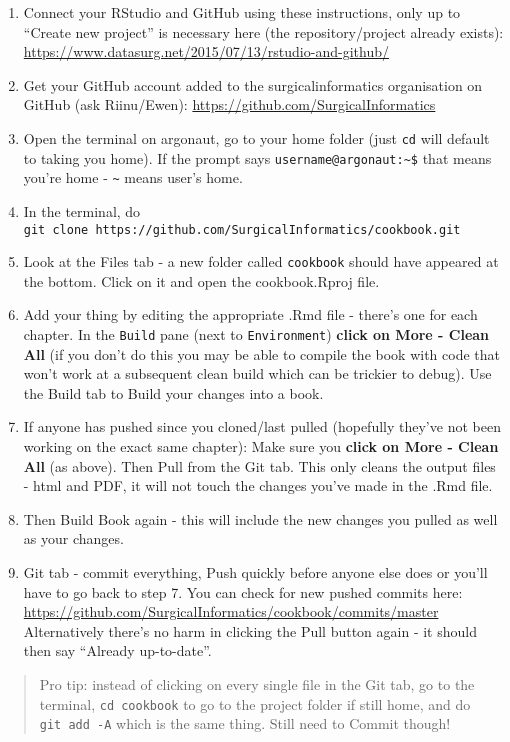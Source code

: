\documentclass[]{book}
\begin{document}
\begin{enumerate}
\def\labelenumi{\arabic{enumi}.}
\item
  Connect your RStudio and GitHub using these instructions, only up to ``Create new project'' is necessary here (the repository/project already exists):
  \url{https://www.datasurg.net/2015/07/13/rstudio-and-github/}
\item
  Get your GitHub account added to the surgicalinformatics organisation on GitHub (ask Riinu/Ewen):
  \url{https://github.com/SurgicalInformatics}
\item
  Open the terminal on argonaut, go to your home folder (just \texttt{cd} will default to taking you home). If the prompt says \texttt{username@argonaut:\textasciitilde{}\$} that means you're home - \texttt{\textasciitilde{}} means user's home.
\item
  In the terminal, do \texttt{git\ clone\ https://github.com/SurgicalInformatics/cookbook.git}
\item
  Look at the Files tab - a new folder called \texttt{cookbook} should have appeared at the bottom. Click on it and open the cookbook.Rproj file.
\item
  Add your thing by editing the appropriate .Rmd file - there's one for each chapter. In the \texttt{Build} pane (next to \texttt{Environment}) \textbf{click on More - Clean All} (if you don't do this you may be able to compile the book with code that won't work at a subsequent clean build which can be trickier to debug). Use the Build tab to Build your changes into a book.
\item
  If anyone has pushed since you cloned/last pulled (hopefully they've not been working on the exact same chapter): Make sure you \textbf{click on More - Clean All} (as above). Then Pull from the Git tab. This only cleans the output files - html and PDF, it will not touch the changes you've made in the .Rmd file.
\item
  Then Build Book again - this will include the new changes you pulled as well as your changes.
\item
  Git tab - commit everything, Push quickly before anyone else does or you'll have to go back to step 7. You can check for new pushed commits here: \url{https://github.com/SurgicalInformatics/cookbook/commits/master} Alternatively there's no harm in clicking the Pull button again - it should then say ``Already up-to-date''.
\end{enumerate}

\begin{quote}
Pro tip: instead of clicking on every single file in the Git tab, go to the terminal, \texttt{cd\ cookbook} to go to the project folder if still home, and do \texttt{git\ add\ -A} which is the same thing. Still need to Commit though!
\end{quote}
\end{document}
